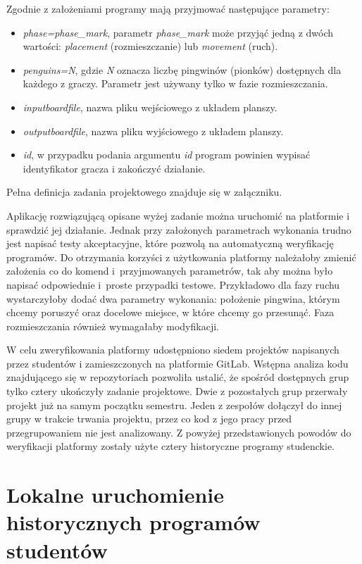 Zgodnie z założeniami programy mają przyjmować następujące parametry:
\begin{itemize}
    \item \textit{phase=phase\_mark}, parametr \textit{phase\_mark} może przyjąć jedną z dwóch wartości: \textit{placement} (rozmieszczanie) lub \textit{movement} (ruch).
    \item \textit{penguins=N}, gdzie \textit{N} oznacza liczbę pingwinów (pionków) dostępnych dla każdego z graczy.
    Parametr jest używany tylko w fazie rozmieszczania.
    \item \textit{inputboardfile}, nazwa pliku wejściowego z układem planszy.
    \item \textit{outputboardfile}, nazwa pliku wyjściowego z układem planszy.
    \item \textit{id}, w przypadku podania argumentu \textit{id} program powinien wypisać identyfikator gracza i zakończyć działanie.
\end{itemize}
Pełna definicja zadania projektowego znajduje się w załączniku.

Aplikację rozwiązującą opisane wyżej zadanie można uruchomić na platformie i sprawdzić jej działanie.
Jednak przy założonych parametrach wykonania trudno jest napisać testy akceptacyjne, które pozwolą na automatyczną weryfikację programów.
Do otrzymania korzyści z użytkowania platformy należałoby zmienić założenia co do komend i~przyjmowanych parametrów, tak aby można było napisać odpowiednie i~proste przypadki testowe.
Przykładowo dla fazy ruchu wystarczyłoby dodać dwa parametry wykonania: położenie pingwina, którym chcemy poruszyć oraz docelowe miejsce, w które chcemy go przesunąć.
Faza rozmieszczania również wymagałaby modyfikacji.

W celu zweryfikowania platformy udostępniono siedem projektów napisanych przez studentów i zamieszczonych na platformie GitLab.
Wstępna analiza kodu znajdującego się w repozytoriach pozwoliła ustalić, że spośród dostępnych grup tylko cztery ukończyły zadanie projektowe.
Dwie z pozostałych grup przerwały projekt już na samym początku semestru.
Jeden z zespołów dołączył do innej grupy w trakcie trwania projektu, przez co kod z jego pracy przed przegrupowaniem nie jest analizowany.
Z powyżej przedstawionych powodów do weryfikacji platformy zostały użyte cztery historyczne programy studenckie.

\section{Lokalne uruchomienie historycznych programów studentów}

